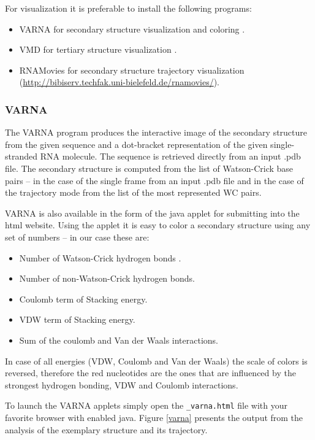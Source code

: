\documentclass[12pt]{article}
\begin{document}
For visualization it is preferable to install the following programs:
\begin{itemize}
\item VARNA for secondary structure visualization and coloring \cite{Blin2009}.
\item VMD for tertiary structure visualization \cite{Humphrey1996}.
\item RNAMovies for secondary structure trajectory visualization (\url{http://bibiserv.techfak.uni-bielefeld.de/rnamovies/}).
\end{itemize}

\subsubsection{VARNA}
The VARNA \cite{Blin2009} program produces the interactive image of the secondary structure from the given sequence and a dot-bracket representation of the given single-stranded RNA molecule. The sequence is retrieved directly from an input .pdb file. The secondary structure is computed from the list of Watson-Crick base pairs -- in the case of the single frame from an input .pdb file and in the case of the trajectory mode from the list of the most represented WC pairs.  

VARNA is also available in the form of the java applet for submitting into the html website. Using the applet it is easy to color a secondary structure using any set of numbers -- in our case these are: 
\begin{itemize}
\item Number of Watson-Crick hydrogen bonds .
\item Number of non-Watson-Crick hydrogen bonds.
\item Coulomb term of Stacking energy. 
\item VDW term of Stacking energy.
\item Sum of the coulomb and Van der Waals interactions. 
\end{itemize}

In case of all energies (VDW, Coulomb and Van der Waals) the scale of colors is reversed, therefore the red nucleotides are the ones that are influenced by the strongest hydrogen bonding, VDW and Coulomb interactions. 

To launch the VARNA applets simply open the \texttt{\_varna.html} file with your favorite browser with enabled java. Figure \ref{varna} presents the output from the analysis of the exemplary structure and its trajectory. 
\end{document}
